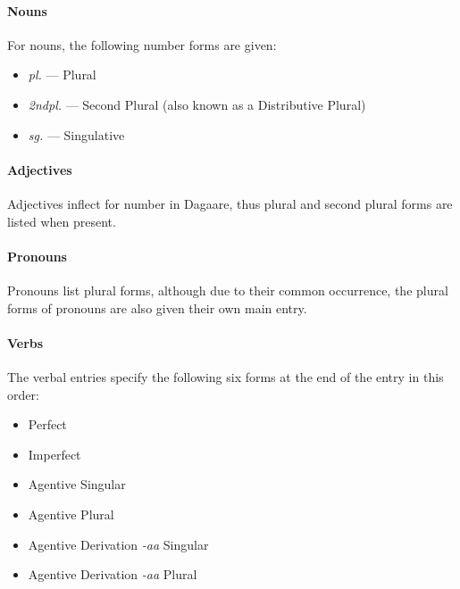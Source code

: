 \begin{refsection}







\paragraph*{Nouns} For nouns, the following number forms are given:

\begin{itemize}\setlength\itemsep{0em}
 \item \textit{ pl.} — Plural
\item \textit{ 2ndpl.} — Second Plural (also known as a Distributive Plural) 
\item \textit{ sg.} — Singulative
\end{itemize}

\paragraph*{Adjectives}

Adjectives inflect for number in Dagaare, thus  plural and second plural forms are listed when present.  

\paragraph*{Pronouns}

Pronouns list plural forms, although due to their common occurrence, the plural forms of pronouns are also given their own main entry. 

\paragraph*{Verbs}

The verbal entries specify the following six forms at the end of the entry  in this order:  

\begin{itemize}\setlength\itemsep{0em}
\item Perfect \item Imperfect \item Agentive Singular \item Agentive Plural \item Agentive Derivation \textit{ -aa} Singular \item Agentive Derivation \textit{ -aa} Plural
\end{itemize}



\end{refsection}
